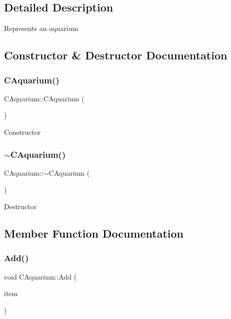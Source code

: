 \subsection{Detailed Description}
Represents an aquarium 

\subsection{Constructor \& Destructor Documentation}
\mbox{\label{class_c_aquarium_ab6ba8b1abd87437ff66748e82173a5a8}} 
\subsubsection{\texorpdfstring{C\+Aquarium()}{CAquarium()}}
{\footnotesize\ttfamily C\+Aquarium\+::\+C\+Aquarium (\begin{DoxyParamCaption}{ }\end{DoxyParamCaption})}

Constructor \mbox{\label{class_c_aquarium_ab1baf78dc047af2b8cab8982e1446875}} 
\subsubsection{\texorpdfstring{$\sim$\+C\+Aquarium()}{~CAquarium()}}
{\footnotesize\ttfamily C\+Aquarium\+::$\sim$\+C\+Aquarium (\begin{DoxyParamCaption}{ }\end{DoxyParamCaption})\hspace{0.3cm}{\ttfamily [virtual]}}

Destructor 

\subsection{Member Function Documentation}
\mbox{\label{class_c_aquarium_a85063d05c147cf80f54182016fe12d64}} 
\subsubsection{\texorpdfstring{Add()}{Add()}}
{\footnotesize\ttfamily void C\+Aquarium\+::\+Add (\begin{DoxyParamCaption}\item[{std\+::shared\+\_\+ptr$<$ \mbox{\hyperlink{class_c_item}{C\+Item}} $>$}]{item }\end{DoxyParamCaption})}

